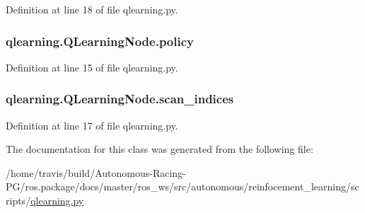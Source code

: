 Definition at line 18 of file qlearning.\+py.

\subsubsection[{\texorpdfstring{policy}{policy}}]{\setlength{\rightskip}{0pt plus 5cm}qlearning.\+Q\+Learning\+Node.\+policy}\hypertarget{classqlearning_1_1_q_learning_node_a2c1150dd506209b085dad03036775375}{}\label{classqlearning_1_1_q_learning_node_a2c1150dd506209b085dad03036775375}


Definition at line 15 of file qlearning.\+py.

\subsubsection[{\texorpdfstring{scan\+\_\+indices}{scan_indices}}]{\setlength{\rightskip}{0pt plus 5cm}qlearning.\+Q\+Learning\+Node.\+scan\+\_\+indices}\hypertarget{classqlearning_1_1_q_learning_node_a40b085aff23685cc49b297f287743ed6}{}\label{classqlearning_1_1_q_learning_node_a40b085aff23685cc49b297f287743ed6}


Definition at line 17 of file qlearning.\+py.



The documentation for this class was generated from the following file\+:\begin{DoxyCompactItemize}
\item 
/home/travis/build/\+Autonomous-\/\+Racing-\/\+P\+G/ros.\+package/docs/master/ros\+\_\+ws/src/autonomous/reinfocement\+\_\+learning/scripts/\hyperlink{qlearning_8py}{qlearning.\+py}\end{DoxyCompactItemize}
